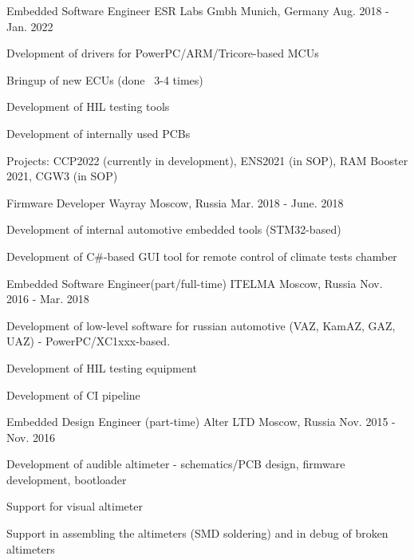 \begin{cventries}
\cventry
{Embedded Software Engineer} %
{ESR Labs Gmbh } %
{Munich, Germany} %
{Aug. 2018 - Jan. 2022} %
{ %
\begin{cvitems}
\item {Dvelopment of drivers for PowerPC/ARM/Tricore-based MCUs}
\item {Bringup of new ECUs (done ~3-4 times)}
\item {Development of HIL testing tools}
\item {Development of internally used PCBs}
\item {Projects: CCP2022 (currently in development), ENS2021 (in SOP), RAM Booster 2021, CGW3 (in SOP)}
\end{cvitems}
}

\cventry
{Firmware Developer} %
{Wayray} %
{Moscow, Russia} %
{Mar. 2018 - June. 2018} %
{ %
\begin{cvitems}
\item {Development of internal automotive embedded tools (STM32-based)}
\item {Development of C\#-based GUI tool for remote control of climate tests chamber}
\end{cvitems}
}


\cventry
{Embedded Software Engineer(part/full-time)} %
{ITELMA} %
{Moscow, Russia} %
{Nov. 2016 - Mar. 2018} %
{ %
\begin{cvitems}
\item {Development of low-level software for russian automotive (VAZ, KamAZ, GAZ, UAZ) - PowerPC/XC1xxx-based.}
\item {Development of HIL testing equipment}
\item {Development of CI pipeline}
\end{cvitems}
}


\cventry
{Embedded Design Engineer (part-time)} %
{Alter LTD} %
{Moscow, Russia} %
{Nov. 2015 - Nov. 2016} %
{ %
\begin{cvitems}
\item {Development of audible altimeter - schematics/PCB design, firmware development, bootloader }
\item {Support for visual altimeter}
\item {Support in assembling the altimeters (SMD soldering) and in debug of broken altimeters}
\end{cvitems}
}


\end{cventries}
